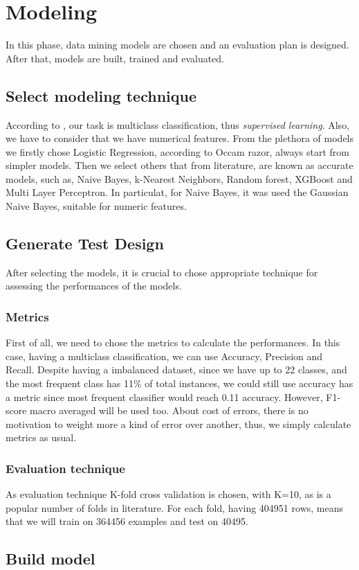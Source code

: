 \section{Modeling}

In this phase, data mining models are chosen and an evaluation plan is designed. After that, models are built, trained and evaluated.
\subsection{Select modeling technique}

According to , our task is multiclass classification, thus \textit{supervised learning}. Also, we have to consider that we have numerical features. From the plethora of models we firstly chose Logistic Regression, according to Occam razor, always start from simpler models. Then we select others that from literature, are known as accurate models, such as, Naive Bayes, k-Nearest Neighbors, Random forest, XGBoost and Multi Layer Perceptron. 
In particulat, for Naive Bayes, it was used the Gaussian Naive Bayes, suitable for numeric features.


\subsection{Generate Test Design}

After selecting the models, it is crucial to chose appropriate technique for assessing the performances of the models.

\subsubsection{Metrics}

First of all, we need to chose the metrics to calculate the performances. In this case, having a multiclass classification, we can use Accuracy, Precision and Recall. Despite having a imbalanced dataset, since we have up to 22 classes, and the most frequent class has 11\% of total instances, we could still use accuracy has a metric since most frequent classifier would reach 0.11 accuracy. However, F1-score macro averaged will be used too. 
About cost of errors, there is no motivation to weight more a kind of error over another, thus, we simply calculate metrics as usual. 

\subsubsection{Evaluation technique}

As evaluation technique K-fold cross validation is chosen, with K=10, as is a popular number of folds in literature.
For each fold, having 404951 rows, means that we will train on 364456 examples and test on 40495.

\subsection{Build model}